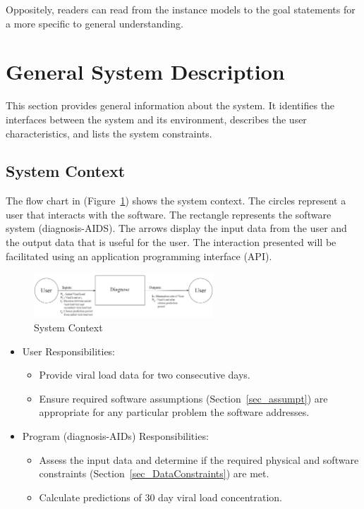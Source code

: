 \documentclass[12pt]{article}
\begin{document}
Oppositely, readers can read from the instance models to the goal statements for 
a more specific to general understanding.

\section{General System Description}

This section provides general information about the system. It identifies 
the interfaces between the system and its environment, describes the user characteristics, and lists the system constraints.

\subsection{System Context}

The flow chart in (Figure~\ref{Fig_SystemContext}) shows the system 
context. The circles represent a user that interacts with the software. The rectangle represents the software system (diagnosis-AIDS). The arrows display the input data from the user and the output data that is useful for the user. The interaction presented will be facilitated using an application programming interface (API).


\begin{figure}[ht]
\begin{center}
 \includegraphics[width=0.6\textwidth]{systemcontext.jpg}
\caption{System Context}
\label{Fig_SystemContext} 
\end{center}
\end{figure}

\begin{itemize}
\item User Responsibilities:
\begin{itemize}
\item Provide viral load data for two consecutive days.
\item Ensure required software assumptions (Section~\ref{sec_assumpt}) are 
appropriate for any particular problem the software addresses.

\end{itemize}
\item Program (diagnosis-AIDs) Responsibilities:
\begin{itemize}
\item Assess the input data and determine if the required physical and software 
constraints (Section~\ref{sec_DataConstraints}) are met.
\item Calculate predictions of 30 day viral load concentration.
\end{itemize}
\end{itemize}
\end{document}
